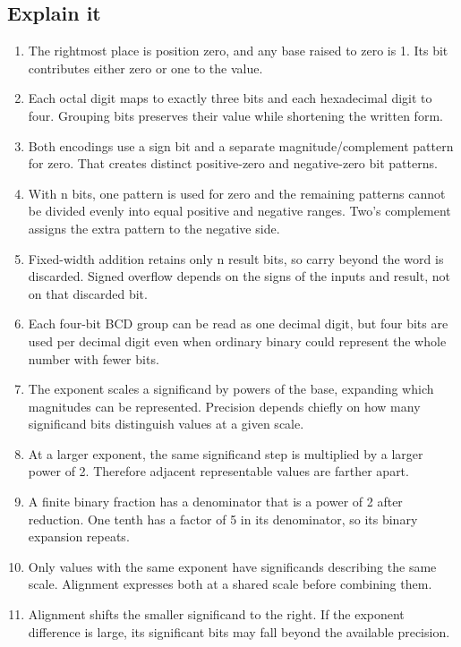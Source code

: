 \documentclass[11pt]{article}
\begin{document}
\begin{keepsection}\subsection{Explain it}

\begin{enumerate}
\item The rightmost place is position zero, and any base raised to zero is 1. Its bit contributes either zero or one to the value.
\item Each octal digit maps to exactly three bits and each hexadecimal digit to four. Grouping bits preserves their value while shortening the written form.
\item Both encodings use a sign bit and a separate magnitude/complement pattern for zero. That creates distinct positive-zero and negative-zero bit patterns.
\item With n bits, one pattern is used for zero and the remaining patterns cannot be divided evenly into equal positive and negative ranges. Two’s complement assigns the extra pattern to the negative side.
\item Fixed-width addition retains only n result bits, so carry beyond the word is discarded. Signed overflow depends on the signs of the inputs and result, not on that discarded bit.
\item Each four-bit BCD group can be read as one decimal digit, but four bits are used per decimal digit even when ordinary binary could represent the whole number with fewer bits.
\item The exponent scales a significand by powers of the base, expanding which magnitudes can be represented. Precision depends chiefly on how many significand bits distinguish values at a given scale.
\item At a larger exponent, the same significand step is multiplied by a larger power of 2. Therefore adjacent representable values are farther apart.
\item A finite binary fraction has a denominator that is a power of 2 after reduction. One tenth has a factor of 5 in its denominator, so its binary expansion repeats.
\item Only values with the same exponent have significands describing the same scale. Alignment expresses both at a shared scale before combining them.
\item Alignment shifts the smaller significand to the right. If the exponent difference is large, its significant bits may fall beyond the available precision.

\end{enumerate}
\end{keepsection}
\end{document}
